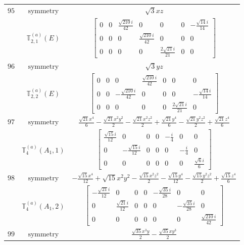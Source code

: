 \documentclass[fleqn,8pt,landscape]{jsarticle}
\begin{document}
\begin{longtable}{ccc}
$ 95 $ & $ \text{symmetry} $ & $ \sqrt{3} x z $ \\
$  $ & $ \mathbb{T}_{2,1}^{(a)}(E) $ & $ \begin{bmatrix} 0 & 0 & \frac{\sqrt{210} i}{42} & 0 & 0 & 0 & - \frac{\sqrt{14} i}{14} \\ 0 & 0 & 0 & \frac{\sqrt{210} i}{42} & 0 & 0 & 0 \\ 0 & 0 & 0 & 0 & \frac{2 \sqrt{21} i}{21} & 0 & 0 \end{bmatrix} $ \\ \hline
$ 96 $ & $ \text{symmetry} $ & $ \sqrt{3} y z $ \\
$  $ & $ \mathbb{T}_{2,2}^{(a)}(E) $ & $ \begin{bmatrix} 0 & 0 & 0 & \frac{\sqrt{210} i}{42} & 0 & 0 & 0 \\ 0 & 0 & - \frac{\sqrt{210} i}{42} & 0 & 0 & 0 & - \frac{\sqrt{14} i}{14} \\ 0 & 0 & 0 & 0 & 0 & \frac{2 \sqrt{21} i}{21} & 0 \end{bmatrix} $ \\ \hline
$ 97 $ & $ \text{symmetry} $ & $ \frac{\sqrt{21} x^{4}}{6} - \frac{\sqrt{21} x^{2} y^{2}}{2} - \frac{\sqrt{21} x^{2} z^{2}}{2} + \frac{\sqrt{21} y^{4}}{6} - \frac{\sqrt{21} y^{2} z^{2}}{2} + \frac{\sqrt{21} z^{4}}{6} $ \\
$  $ & $ \mathbb{T}_{4}^{(a)}(A_{1},1) $ & $ \begin{bmatrix} \frac{\sqrt{15} i}{12} & 0 & 0 & 0 & - \frac{i}{4} & 0 & 0 \\ 0 & - \frac{\sqrt{15} i}{12} & 0 & 0 & 0 & - \frac{i}{4} & 0 \\ 0 & 0 & 0 & 0 & 0 & 0 & \frac{\sqrt{6} i}{6} \end{bmatrix} $ \\ \hline
$ 98 $ & $ \text{symmetry} $ & $ - \frac{\sqrt{15} x^{4}}{12} + \sqrt{15} x^{2} y^{2} - \frac{\sqrt{15} x^{2} z^{2}}{2} - \frac{\sqrt{15} y^{4}}{12} - \frac{\sqrt{15} y^{2} z^{2}}{2} + \frac{\sqrt{15} z^{4}}{6} $ \\
$  $ & $ \mathbb{T}_{4}^{(a)}(A_{1},2) $ & $ \begin{bmatrix} - \frac{\sqrt{21} i}{12} & 0 & 0 & 0 & - \frac{\sqrt{35} i}{28} & 0 & 0 \\ 0 & \frac{\sqrt{21} i}{12} & 0 & 0 & 0 & - \frac{\sqrt{35} i}{28} & 0 \\ 0 & 0 & 0 & 0 & 0 & 0 & \frac{\sqrt{210} i}{42} \end{bmatrix} $ \\ \hline
$ 99 $ & $ \text{symmetry} $ & $ \frac{\sqrt{35} x^{3} y}{2} - \frac{\sqrt{35} x y^{3}}{2} $ \\

\end{longtable}
\end{document}
